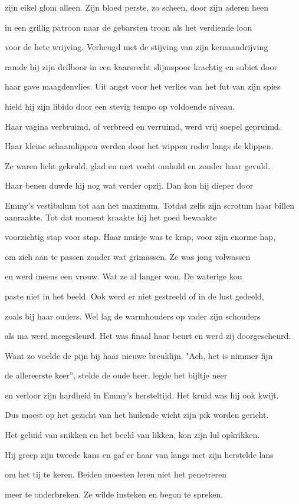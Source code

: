 zijn eikel glom alleen.
Zijn bloed perste, zo scheen,
door zijn aderen heen

in een grillig patroon
naar de gebarsten troon
als het verdiende loon

voor de hete wrijving. Verheugd met de stijving
van zijn kernaandrijving

ramde hij zijn drilboor
in een kaarsrecht slijmspoor
krachtig en subiet door

haar gave maagdenvlies.
Uit angst voor het verlies
van het fut van zijn spies

hield hij zijn libido
door een stevig tempo
op voldoende niveau.

Haar vagina verbruimd,
of verbreed en verruimd,
werd vrij soepel gepruimd.

Haar kleine schaamlippen
werden door het wippen
roder langs de klippen.

Ze waren licht gekruld,
glad en met vocht omhuld
en zonder haar gevuld.

Haar benen duwde hij
nog wat verder opzij.
Dan kon hij dieper door

Emmy’s vestibulum
tot aan het maximum.
Totdat zelfs zijn scrotum
haar billen aanraakte.
Tot dat moment kraakte
hij het goed bewaakte

voorzichtig stap voor stap.
Haar muisje was te krap,
voor zijn enorme hap,

om zich aan te passen
zonder wat grimassen.
Ze was jong volwassen

en werd ineens een vrouw.
Wat ze al langer wou.
De waterige kou

paste niet in het beeld.
Ook werd er niet gestreeld
of in de lust gedeeld,

zoals bij haar ouders.
Wel lag de warmhouders
op vader zijn schouders

als ma werd meegesleurd.
Het was finaal haar beurt
en werd zij doorgescheurd.

Want zo voelde de pijn
bij haar nieuwe breuklijn.
"Ach, het is nimmer fijn

de allereerste keer”,
stelde de oude heer,
legde het bijltje neer

en verloor zijn hardheid
in Emmy’s hersteltijd.
Het kruid was hij ook kwijt.

Dus moest op het gezicht
van het huilende wicht
zijn pik worden gericht.

Het geluid van snikken
en het beeld van likken,
kon zijn lul opkrikken.

Hij greep zijn tweede kans
en gaf er haar van langs
met zijn herstelde lans

om het tij te keren.
Beiden moesten leren
niet het penetreren

meer te onderbreken.
Ze wilde insteken
en begon te spreken.
